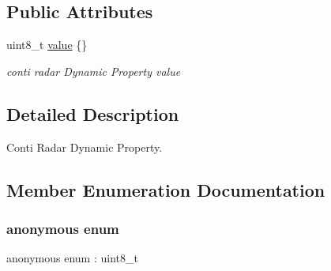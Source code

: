 \subsection*{Public Attributes}
\begin{DoxyCompactItemize}
\item 
uint8\+\_\+t \hyperlink{structmaf__perception__interface_1_1ContiRadarDynamicProperty_a19bb2e53faa85eb6ec959ce879018a72}{value} \{\}
\begin{DoxyCompactList}\small\item\em conti radar Dynamic Property value \end{DoxyCompactList}\end{DoxyCompactItemize}


\subsection{Detailed Description}
Conti Radar Dynamic Property. 

\subsection{Member Enumeration Documentation}
\mbox{\label{structmaf__perception__interface_1_1ContiRadarDynamicProperty_ae9e35455924ab1b3f7c4638997ebb794}} 
\subsubsection{\texorpdfstring{anonymous enum}{anonymous enum}}
{\footnotesize\ttfamily anonymous enum \+: uint8\+\_\+t}

